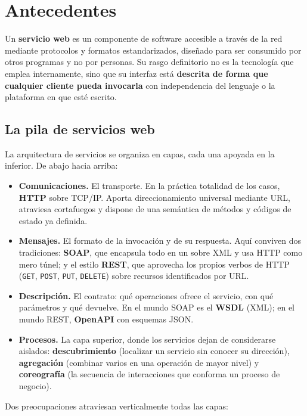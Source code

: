 \documentclass[12pt]{article}
\begin{document}
\section{Antecedentes}

Un \textbf{servicio web} es un componente de software accesible a través de la red mediante protocolos y formatos estandarizados, diseñado para ser consumido por otros programas y no por personas. Su rasgo definitorio no es la tecnología que emplea internamente, sino que su interfaz está \textbf{descrita de forma que cualquier cliente pueda invocarla} con independencia del lenguaje o la plataforma en que esté escrito.

\subsection{La pila de servicios web}

La arquitectura de servicios se organiza en capas, cada una apoyada en la inferior. De abajo hacia arriba:

\begin{itemize}[itemsep=3pt]
    \item \textbf{Comunicaciones.} El transporte. En la práctica totalidad de los casos, \textbf{HTTP} sobre TCP/IP. Aporta direccionamiento universal mediante URL, atraviesa cortafuegos y dispone de una semántica de métodos y códigos de estado ya definida.
    \item \textbf{Mensajes.} El formato de la invocación y de su respuesta. Aquí conviven dos tradiciones: \textbf{SOAP}, que encapsula todo en un sobre XML y usa HTTP como mero túnel; y el estilo \textbf{REST}, que aprovecha los propios verbos de HTTP (\texttt{GET}, \texttt{POST}, \texttt{PUT}, \texttt{DELETE}) sobre recursos identificados por URL.
    \item \textbf{Descripción.} El contrato: qué operaciones ofrece el servicio, con qué parámetros y qué devuelve. En el mundo SOAP es el \textbf{WSDL} (XML); en el mundo REST, \textbf{OpenAPI} con esquemas JSON.
    \item \textbf{Procesos.} La capa superior, donde los servicios dejan de considerarse aislados: \textbf{descubrimiento} (localizar un servicio sin conocer su dirección), \textbf{agregación} (combinar varios en una operación de mayor nivel) y \textbf{coreografía} (la secuencia de interacciones que conforma un proceso de negocio).
\end{itemize}

Dos preocupaciones atraviesan verticalmente todas las capas:
\end{document}
